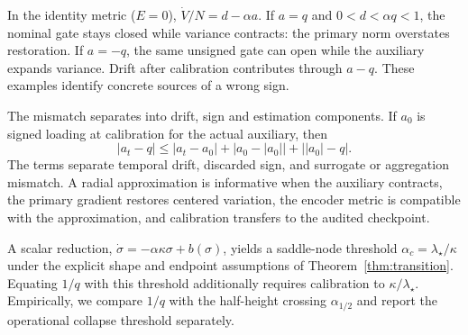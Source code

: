 In the identity metric ($E=0$), $\dot V/N=d-\alpha a$. If $a=q$ and $0<d<\alpha q<1$, the nominal gate stays closed while variance contracts: the primary norm overstates restoration. If $a=-q$, the same unsigned gate can open while the auxiliary expands variance. Drift after calibration contributes through $a-q$. These examples identify concrete sources of a wrong sign.

The mismatch separates into drift, sign and estimation components. If $a_0$ is signed loading at calibration for the actual auxiliary, then
\begin{equation}
 |a_t-q|\le |a_t-a_0|+|a_0-|a_0||+\bigl||a_0|-q\bigr|.
 \label{eq:mismatch_split}
\end{equation}
The terms separate temporal drift, discarded sign, and surrogate or aggregation mismatch. A radial approximation is informative when the auxiliary contracts, the primary gradient restores centered variation, the encoder metric is compatible with the approximation, and calibration transfers to the audited checkpoint.

A scalar reduction, $\dot\sigma=-\alpha\kappa\sigma+b(\sigma)$, yields a saddle-node threshold $\alpha_c=\lambda_\star/\kappa$ under the explicit shape and endpoint assumptions of Theorem~\ref{thm:transition}. Equating $1/q$ with this threshold additionally requires calibration to $\kappa/\lambda_\star$. Empirically, we compare $1/q$ with the half-height crossing $\alpha_{1/2}$ and report the operational collapse threshold separately.
